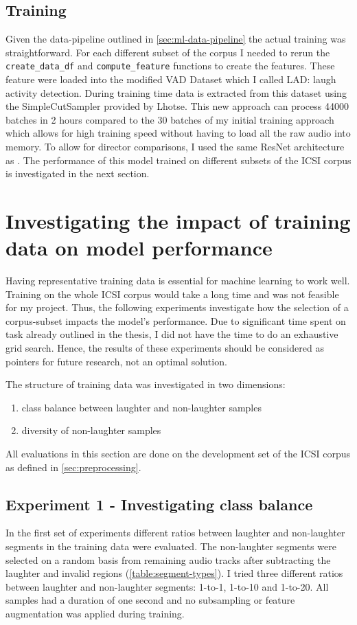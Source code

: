 \documentclass[bsc,frontabs,parskip,deptreport]{infthesis}
\begin{document}
\section{Training}
Given the data-pipeline outlined in \autoref{sec:ml-data-pipeline} the actual training was straightforward. For each different subset of the corpus I needed to rerun the \verb|create_data_df| and \verb|compute_feature| functions to create the features. 
These feature were loaded into the modified VAD Dataset which I called LAD: laugh activity detection.
During training time data is extracted from this dataset using the SimpleCutSampler provided by Lhotse. 
This new approach can process 44000 batches in 2 hours compared to the 30 batches of my initial training approach which allows for high training speed without having to load all the raw audio into memory.
To allow for director comparisons, I used the same ResNet architecture as \citeauthor{gillick2021robust}.
The performance of this model trained on different subsets of the ICSI corpus is investigated in the next section.

\chapter{Investigating the impact of training data on model performance} \label{cha:experiments}
Having representative training data is essential for machine learning to work well. Training on the whole ICSI corpus would take a long time and was not feasible for my project.
Thus, the following experiments investigate how the selection of a corpus-subset impacts the model's performance. 
Due to significant time spent on task already outlined in the thesis, I did not have the time to do an exhaustive grid search. Hence, the results of these experiments should be considered as pointers for future research, not an optimal solution.

The structure of training data was investigated in two dimensions: 
\begin{enumerate}
    \item class balance between laughter and non-laughter samples
    \item diversity of non-laughter samples 
\end{enumerate}

All evaluations in this section are done on the development set of the ICSI corpus as defined in \autoref{sec:preprocessing}.

\section{Experiment 1 - Investigating class balance} \label{sec:exp-1}
In the first set of experiments different ratios between laughter and non-laughter segments in the training data were evaluated. 
The non-laughter segments were selected on a random basis from remaining audio tracks after subtracting the laughter and invalid regions (\autoref{table:segment-types}). 
I tried three different ratios between laughter and non-laughter segments: 1-to-1, 1-to-10 and 1-to-20.
All samples had a duration of one second and no subsampling or feature augmentation was applied during training.
\end{document}
